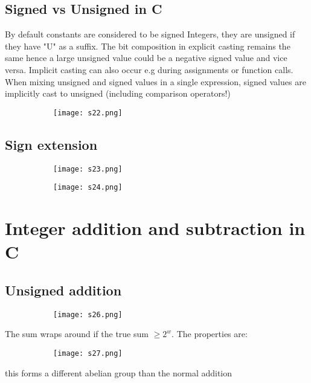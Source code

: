 \documentclass[8pt]{extreport}
\begin{document}
\subsection{Signed vs Unsigned in C}
By default constants are considered to be signed Integers, they are unsigned if they have "U" as a suffix. The bit composition in explicit casting remains the same hence a large unsigned value could be a negative signed value and vice versa. Implicit casting can also occur e.g during assignments or function calls.\\
When mixing unsigned and signed values in a single expression, signed values are implicitly cast to unsigned (including comparison operators!)
\begin{figure}[H]
\centering
\begin{subfigure}[b]{0.4\linewidth}
\texttt{[image: s22.png]}
\end{subfigure}
\end{figure}



\subsection{Sign extension}
\begin{figure}[H]
\centering
\begin{subfigure}[b]{0.4\linewidth}
\texttt{[image: s23.png]}
\end{subfigure}
\begin{subfigure}[b]{0.4\linewidth}
\texttt{[image: s24.png]}
\end{subfigure}
\end{figure}


\section{Integer addition and subtraction in C}

\subsection{Unsigned addition}
\begin{figure}[H]
\centering
\begin{subfigure}[b]{0.4\linewidth}
\texttt{[image: s26.png]}
\end{subfigure}
\end{figure}
The sum wraps around if the true sum $\geq 2^w$. The properties are:
\begin{figure}[H]
\centering
\begin{subfigure}[b]{0.4\linewidth}
\texttt{[image: s27.png]}
\end{subfigure}
\end{figure}
this forms a different abelian group than the normal addition
\end{document}
